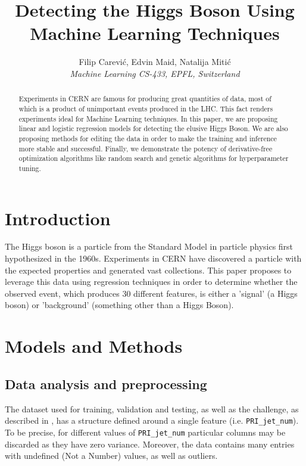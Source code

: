 \documentclass[10pt,conference,compsocconf]{IEEEtran}
\begin{document}
\title{Detecting the Higgs Boson Using Machine Learning Techniques }

\author{
  Filip Carević,
  Edvin Maid,
  Natalija Mitić\\
  \textit{Machine Learning CS-433, EPFL, Switzerland}
}

\maketitle

\begin{abstract}
Experiments in CERN are famous for producing great quantities of data, most of which is a product of unimportant events produced in the LHC. This fact renders experiments ideal for Machine Learning techniques.
In this paper, we are proposing linear and logistic regression models for detecting the elusive Higgs Boson. We are also proposing methods for editing the data in order to make the training and inference more stable and successful. Finally, we demonstrate the potency of derivative-free optimization algorithms like random search and genetic algorithms for hyperparameter tuning.
\end{abstract}

\section{Introduction}
The Higgs boson is a particle from the Standard Model in particle physics first hypothesized in the 1960s. Experiments in CERN have discovered a particle with the expected properties and generated vast collections. This paper proposes to leverage this data using regression techniques in order to determine whether the observed event, which produces 30 different features, is either a 'signal' (a Higgs boson) or 'background' (something other than a Higgs Boson).

\section{Models and Methods}
\label{sec:models-methods}

\subsection{Data analysis and preprocessing}

The dataset used for training, validation and testing, as well as the challenge, as described in \cite{pmlr-v42-cowa14}, has a structure defined around a single feature (i.e. \texttt{PRI\_jet\_num}). To be precise, for different values of \texttt{PRI\_jet\_num} particular columns may be discarded as they have zero variance. Moreover, the data contains many entries with undefined (Not a Number) values, as well as outliers. 
\end{document}
